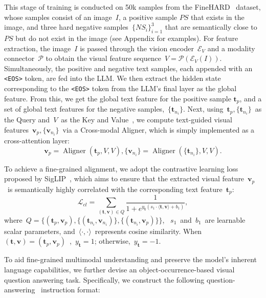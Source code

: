\documentclass{article}
\theoremstyle{plain}
\theoremstyle{definition}
\theoremstyle{remark}
\begin{document}
This stage of training is conducted on 50k samples from the FineHARD~\cite{finehard} dataset, whose samples consist of an image~$I$, a positive sample $\mathit{PS}$ that exists in the image, and three hard negative samples~$\{\mathit{NS}_i\}_{i=1}^3$ that are semantically close to $\mathit{PS}$ but do not exist in the image (see Appendix for examples). For feature extraction, the image~$I$ is passed through the vision encoder~$\mathcal{E}_V$ and a modality connector~$\mathcal{P}$ to obtain the visual feature sequence~$V = \mathcal{P}(\mathcal{E}_V(I))$. Simultaneously, the positive and negative text samples, each appended with an \texttt{<EOS>} token, are fed into the LLM. We then extract the hidden state corresponding to the \texttt{<EOS>} token from the LLM's final layer as the global feature.
From this, we get the global text feature for the positive sample $\mathbf{t}_{p}$, and a set of global text features for the negative samples,~$\{\mathbf{t}_{n_i}\}$. Next, using~$\mathbf{t}_{p},\{\mathbf{t}_{n_i}\}$~as the Query and~$V$~as the Key and Value~\cite{transformer}, we compute text-guided visual features~$\mathbf{v}_{p}, \{\mathbf{v}_{n_i}\}$~via a Cross-modal Aligner, which is simply implemented as a cross-attention layer:
\begin{equation}
\mathbf{v}_{p} = \operatorname{Aligner}\left(\mathbf{t}_{p}, V, V\right), \{\mathbf{v}_{n_i}\} = \operatorname{Aligner}\left(\{\mathbf{t}_{n_i}\}, V, V\right).
\label{eq:stage1_cross_attn}
\end{equation}

To achieve a fine-grained alignment, we adopt the contrastive learning loss proposed by SigLIP~\cite{siglip}, which aims to ensure that the extracted visual feature~$\mathbf{v}_{p}$~is semantically highly correlated with the corresponding text feature~$\mathbf{t}_{p}$:
\begin{equation}
\mathcal{L}_{cl} = \sum_{\mathbf{(t,v)} \in Q} \frac{1}{1 + e^{y_{\mathbf{t}}(s_1 \cdot \langle \mathbf{t}, \mathbf{v} \rangle + b_1)}},
\label{eq:contrastive_loss}
\end{equation}
where~$Q=\{(\mathbf{t}_{p},\mathbf{v}_{p}),\{(\mathbf{t}_{n_i},\mathbf{v}_{n_i})\},\{(\mathbf{t}_{n_i},\mathbf{v}_{p})\}\}$,
~$s_1$~and~$b_1$~are learnable scalar parameters, and~$\langle \cdot, \cdot \rangle$~represents cosine similarity. When~$(\mathbf{t},\mathbf{v})=(\mathbf{t}_{p},\mathbf{v}_{p})$~,~$y_{\mathbf{t}}=1$; otherwise,~$y_{\mathbf{t}}=-1$.

To aid fine-grained multimodal understanding and preserve the model's inherent language capabilities, we further devise an object-occurrence-based visual question answering task. Specifically, we construct the following question-answering~\cite{vqa} instruction format:
\end{document}
